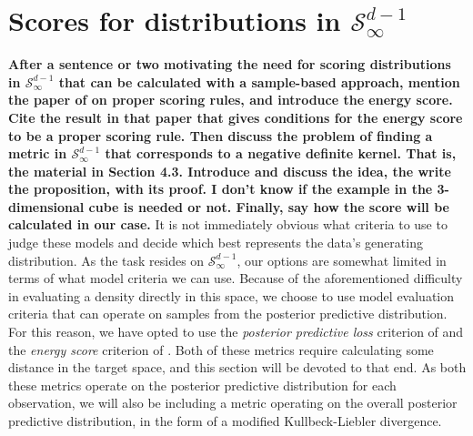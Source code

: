 \section{Scores for distributions in $\mathcal{S}_\infty^{d-1}$}
\label{sec:evaluation}

{\bf After a sentence or two motivating the need for scoring distributions in $\mathcal{S}_\infty^{d-1}$ that can be calculated with a sample-based approach, mention the paper of \cite{gneiting2007} on proper scoring rules, and introduce the energy score. Cite the result in that paper that gives conditions for the energy score to be a proper scoring rule. Then discuss the problem of finding a metric in $\mathcal{S}_\infty^{d-1}$ that corresponds to a negative definite kernel. That is, the material in Section 4.3. Introduce and discuss the idea, the write the proposition, with its proof. I don't know if the example in the 3-dimensional cube is needed or not. Finally, say how the score will be calculated in our case.
}
It is not immediately obvious what criteria to use to judge these models and decide which best
  represents the data's generating distribution.  As the task resides on $\mathcal{S}_{\infty}^{d-1}$,
  our options are somewhat limited in terms of what model criteria we can use.  Because of the aforementioned
  difficulty in evaluating a density directly in this space, we choose to use model evaluation
  criteria that can operate on samples from the posterior predictive distribution.  For this reason,
  we have opted to use the \emph{posterior predictive loss} criterion of \cite{gelfand1998} and the
  \emph{energy score} criterion of \cite{gneiting2007}.  Both of these metrics require calculating
  some distance in the target space, and this section will be devoted to that end.  As both these
  metrics operate on the posterior predictive distribution for each observation, we will also be
  including a metric operating on the overall posterior predictive distribution, in the form of a
  modified Kullbeck-Liebler divergence.

